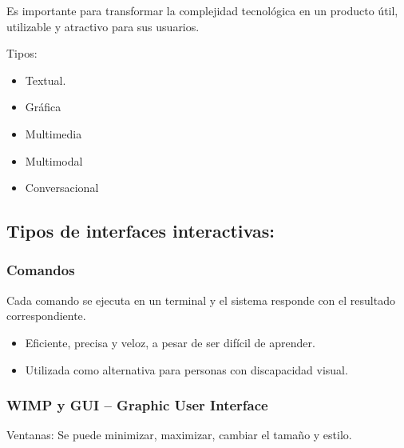 \documentclass[12pt, twoside, openright]{report} %
\begin{document}
	Es importante para transformar la complejidad tecnológica en un
    producto útil, utilizable y atractivo para sus usuarios.

	Tipos:

    \begin{itemize}
    
    \item
      Textual.
    \item
      Gráfica
    \item
      Multimedia
    \item
      Multimodal
    \item
      Conversacional
    \end{itemize}

\subsection{Tipos de interfaces interactivas:}

\subsubsection{Comandos}
Cada comando se ejecuta en un terminal y el sistema
      responde con el resultado correspondiente.

      \begin{itemize}
      
      \item
        Eficiente, precisa y veloz, a pesar de ser difícil de aprender.
      \item
        Utilizada como alternativa para personas con discapacidad
        visual.
      \end{itemize}
\pagebreak
	 \subsubsection{WIMP y GUI -- Graphic User Interface} 

        Ventanas: Se puede minimizar, maximizar, cambiar el tamaño y
        estilo.
\end{document}
